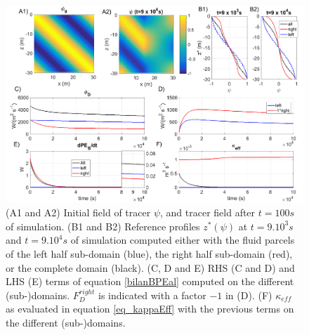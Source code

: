 \begin{figure}[h!]
\centering
\includegraphics[width=1\textwidth]{./CHAP_BPE/AGBPE_numlab2_2.png}
\caption{(A1 and A2) Initial field of tracer $\psi$, and tracer field after $t=100s$ of simulation. (B1 and B2) Reference profiles $z^*(\psi)$ at $t=9.10^3s$ and $t=9.10^4s$ of simulation computed either with the fluid parcels of the left half sub-domain (blue), the right half sub-domain (red), or the complete domain (black). (C, D and E) RHS (C and D) and LHS (E) terms of equation \ref{bilanBPEal} computed on the different (sub-)domains. $F_D^{right}$ is indicated with a factor $-1$ in (D). (F) $\kappa_{eff}$ as evaluated in equation \ref{eq_kappaEff} with the previous terms on the different (sub-)domains.}
\label{fig2numlab}
\end{figure}

